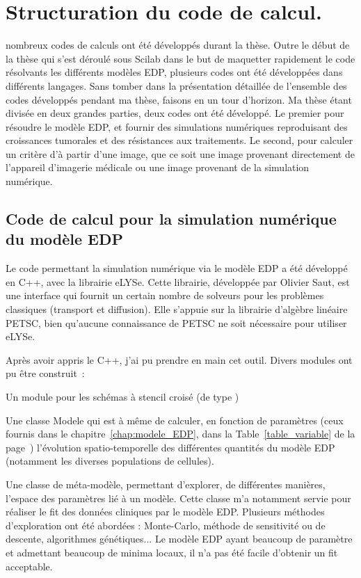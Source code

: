 \documentclass[main.tex]{subfiles}
\begin{document}
\chapter{Structuration du code de calcul. \label{chap:structure_code} }
 nombreux codes de calculs ont été développés durant la thèse. Outre le début de la thèse qui s'est déroulé sous Scilab dans le but de maquetter rapidement le code résolvants les différents modèles EDP, plusieurs codes ont été développées dans différents langages. 
Sans tomber dans la présentation détaillée de l'ensemble des codes développés pendant ma thèse, faisons en un tour d'horizon. Ma thèse étant divisée en deux grandes parties, deux codes ont été développé. Le premier pour résoudre le modèle EDP, et fournir des simulations numériques reproduisant des croissances tumorales et des résistances aux traitements. Le second, pour calculer un critère d'\hetero à partir d'une image, que ce soit une image provenant directement de l'appareil d'imagerie médicale ou une image provenant de la simulation numérique.  

\section{Code de calcul pour la simulation numérique du modèle EDP}
Le code permettant la simulation numérique via le modèle EDP a été développé en C++, avec la librairie eLYSe. Cette librairie, développée par Olivier Saut, est une interface qui fournit un certain nombre de solveurs pour les problèmes classiques (transport et diffusion). Elle s'appuie sur la librairie d'algèbre linéaire PETSC, bien qu'aucune connaissance de PETSC ne soit nécessaire pour utiliser eLYSe. 

Après avoir appris le C++, j'ai pu prendre en main cet outil. Divers modules ont pu être construit~:
\begin{myitemize}
\item Un module pour les schémas à stencil croisé (de type \twinweno)
\item Une classe Modele qui est à même de calculer, en fonction de paramètres (ceux fournis dans le chapitre~\ref{chap:modele_EDP}, dans la Table~\ref{table_variable} de la  page~\pageref{table_variable}) l'évolution spatio-temporelle des différentes quantités du modèle EDP (notamment les diverses populations de cellules). 
\item Une classe de méta-modèle, permettant d'explorer, de différentes manières, l'espace des paramètres lié à un modèle. Cette classe m'a notamment servie pour réaliser le fit des données cliniques par le modèle EDP. Plusieurs méthodes d'exploration ont été abordées : Monte-Carlo, méthode de sensitivité ou de descente, algorithmes génétiques... Le modèle EDP ayant beaucoup de paramètre et admettant beaucoup de minima locaux, il n'a pas été facile d'obtenir un fit acceptable. 
\end{myitemize}
\end{document}
